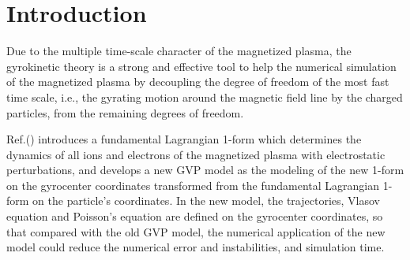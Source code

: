\documentclass[12pt]{iopart}
\begin{document}

\maketitle

\section{Introduction}\label{sec1}

Due to the multiple time-scale character of the magnetized plasma, the gyrokinetic theory is a strong and effective tool to help the numerical simulation of the magnetized plasma by decoupling the degree of freedom of the most fast time scale, i.e., the gyrating motion around the magnetic field line by the charged particles, from the remaining degrees of freedom.


Ref.(\cite{2017shuangxi}) introduces a fundamental Lagrangian 1-form which determines the dynamics of all ions and electrons of the magnetized plasma with electrostatic perturbations, and develops a new GVP model as the modeling of the new 1-form on the gyrocenter coordinates transformed from the fundamental Lagrangian 1-form on the particle's coordinates. In the new model, the trajectories, Vlasov equation and Poisson's equation are defined on the gyrocenter coordinates, so that compared with the old GVP model, the numerical application of the new model could reduce the numerical error and instabilities, and simulation time.
\end{document}
